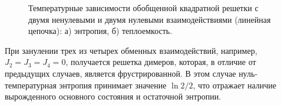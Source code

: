 \documentclass[utf8,12pt]{jetp}
\begin{document}
\begin{figure}[h]
	\begin{minipage}[h]{0.5\linewidth}
	\end{minipage}
	\hfill
	\begin{minipage}[h]{0.5\linewidth}
	\end{minipage}
	\caption{Температурные зависимости обобщенной квадратной решетки с двумя ненулевыми и двумя нулевыми взаимодействиями (линейная цепочка): а) энтропия, б) теплоемкость.}
	\label{Linear}
\end{figure}

При занулении трех из четырех обменных взаимодействий, например, $J_2 = J_3 = J_4 = 0$, получается решетка димеров, которая, в отличие от предыдущих случаев, является фрустрированной. В этом случае нуль-температурная энтропия принимает значение $\ln 2/2$, что отражает наличие вырожденного основного состояния и остаточной энтропии.
\end{document}
